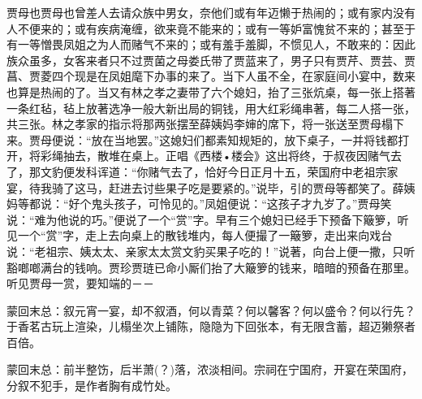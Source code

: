 \begin{parag}
    贾母也贾母也曾差人去请众族中男女，奈他们或有年迈懒于热闹的；或有家内没有人不便来的；或有疾病淹缠，欲来竟不能来的；或有一等妒富愧贫不来的；甚至于有一等憎畏凤姐之为人而赌气不来的；或有羞手羞脚，不惯见人，不敢来的：因此族众虽多，女客来者只不过贾菌之母娄氏带了贾蓝来了，男子只有贾芹、贾芸、贾菖、贾菱四个现是在凤姐麾下办事的来了。当下人虽不全，在家庭间小宴中，数来也算是热闹的了。当又有林之孝之妻带了六个媳妇，抬了三张炕桌，每一张上搭著一条红毡，毡上放著选净一般大新出局的铜钱，用大红彩绳串著，每二人搭一张，共三张。林之孝家的指示将那两张摆至薛姨妈李婶的席下，将一张送至贾母榻下来。贾母便说：“放在当地罢。”这媳妇们都素知规矩的，放下桌子，一并将钱都打开，将彩绳抽去，散堆在桌上。正唱《西楼•楼会》这出将终，于叔夜因赌气去了，那文豹便发科诨道：“你赌气去了，恰好今日正月十五，荣国府中老祖宗家宴，待我骑了这马，赶进去讨些果子吃是要紧的。”说毕，引的贾母等都笑了。薛姨妈等都说：“好个鬼头孩子，可怜见的。”凤姐便说：“这孩子才九岁了。”贾母笑说：“难为他说的巧。”便说了一个“赏”字。早有三个媳妇已经手下预备下簸箩，听见一个“赏”字，走上去向桌上的散钱堆内，每人便撮了一簸箩，走出来向戏台说：“老祖宗、姨太太、亲家太太赏文豹买果子吃的！”说著，向台上便一撒，只听豁啷啷满台的钱响。贾珍贾琏已命小厮们抬了大簸箩的钱来，暗暗的预备在那里。听见贾母一赏，要知端的－－
\end{parag}


\begin{parag}
    \begin{note}蒙回末总：叙元宵一宴，却不叙酒，何以青菜？何以馨客？何以盛令？何以行先？于香茗古玩上渲染，儿榻坐次上铺陈，隐隐为下回张本，有无限含蓄，超迈獭祭者百倍。\end{note}
\end{parag}


\begin{parag}
    \begin{note}蒙回末总：前半整饬，后半萧(？)落，浓淡相间。宗祠在宁国府，开宴在荣国府，分叙不犯手，是作者胸有成竹处。\end{note}
\end{parag}

